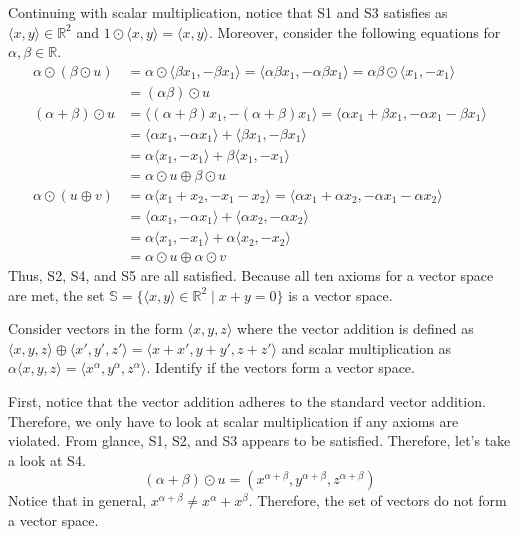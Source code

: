 \documentclass[../main.tex]{subfiles}
\begin{document}
\begin{solution}
Continuing with scalar multiplication, notice that S1 and S3 satisfies
as $\langle x, y \rangle \in \mathbb{R}^2$ and $1 \odot \langle x, y
\rangle = \langle x, y \rangle$. Moreover, consider the following
equations for $\alpha, \beta \in \mathbb{R}$.
\begin{align*}
    \alpha \odot (\beta \odot u)
    &= \alpha \odot \langle \beta x_1, -\beta x_1 \rangle
    = \langle \alpha\beta x_1, -\alpha\beta x_1 \rangle
    = \alpha\beta \odot \langle x_1, -x_1 \rangle \\
    &= (\alpha\beta) \odot u \\
    (\alpha + \beta) \odot u
    &= \langle (\alpha + \beta) x_1, -(\alpha + \beta) x_1 \rangle
    = \langle \alpha x_1 + \beta x_1,
        -\alpha x_1 - \beta x_1 \rangle \\
    &= \langle \alpha x_1, -\alpha x_1 \rangle +
        \langle \beta x_1, -\beta x_1 \rangle \\
    &= \alpha \langle x_1, -x_1 \rangle +
        \beta \langle x_1, -x_1 \rangle \\
    &= \alpha \odot u \oplus \beta \odot u \\
    \alpha \odot (u \oplus v)
    &= \alpha \langle x_1 + x_2, -x_1 - x_2 \rangle
    = \langle \alpha x_1 + \alpha x_2,
        -\alpha x_1 - \alpha x_2 \rangle \\
    &= \langle \alpha x_1, -\alpha x_1 \rangle +
        \langle \alpha x_2, -\alpha x_2 \rangle \\
    &= \alpha \langle x_1, -x_1 \rangle +
        \alpha \langle x_2, -x_2 \rangle \\
    &= \alpha \odot u \oplus \alpha \odot v
\end{align*}
Thus, S2, S4, and S5 are all satisfied. Because all ten axioms for
a vector space are met, the set $\mathbb{S} = \{ \langle x, y \rangle
\in \mathbb{R}^2 \mid x + y = 0 \}$ is a vector space.
\end{solution}

\begin{problem}
Consider vectors in the form $\langle x, y, z \rangle$ where the
vector addition is defined as $\langle x, y, z \rangle \oplus
\langle x', y', z' \rangle = \langle x + x', y + y', z + z' \rangle$
and scalar multiplication as $\alpha \langle x, y, z \rangle =
\langle x^\alpha, y^\alpha, z^\alpha \rangle$. Identify if the vectors
form a vector space.
\end{problem}
\begin{solution}
First, notice that the vector addition adheres to the standard vector
addition. Therefore, we only have to look at scalar multiplication
if any axioms are violated. From glance, S1, S2, and S3 appears to
be satisfied. Therefore, let's take a look at S4.
\[
(\alpha + \beta) \odot u
= \left(
    x^{\alpha + \beta}, y^{\alpha + \beta}, z^{\alpha + \beta}
\right)
\]
Notice that in general, $x^{\alpha + \beta} \neq x^\alpha + x^\beta$.
Therefore, the set of vectors do not form a vector space.
\end{solution}
\end{document}
